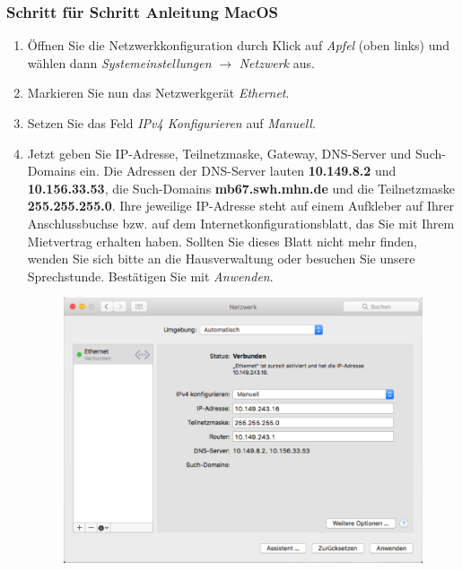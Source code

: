 \documentclass[a4paper,12pt]{scrartcl}
\begin{document}
\subsubsection*{Schritt für Schritt Anleitung MacOS}
\begin{enumerate}
    \item Öffnen Sie die Netzwerkkonfiguration durch Klick auf \emph{Apfel} (oben links) und wählen dann \emph{Systemeinstellungen} $\rightarrow$ \emph{Netzwerk} aus.
    \item Markieren Sie nun das Netzwerkgerät \emph{Ethernet}.
    \item Setzen Sie das Feld \emph{IPv4 Konfigurieren} auf \emph{Manuell}.
    \item Jetzt geben Sie IP-Adresse, Teilnetzmaske, Gateway, DNS-Server und Such-Domains ein. Die Adressen der DNS-Server lauten \textbf{10.149.8.2} und \textbf{10.156.33.53}, die Such-Domains \textbf{mb67.swh.mhn.de} und die Teilnetzmaske \textbf{255.255.255.0}. Ihre jeweilige IP-Adresse steht auf einem Aufkleber auf Ihrer Anschlussbuchse bzw. auf dem Internetkonfigurationsblatt, das Sie mit Ihrem Mietvertrag erhalten haben. Sollten Sie dieses Blatt nicht mehr finden, wenden Sie sich bitte an die Hausverwaltung oder besuchen Sie unsere Sprechstunde. Bestätigen Sie mit \emph{Anwenden}.
      \begin{figure}[h!]
      \centering
        \begin{minipage}[c]{0.60\linewidth}
          \centering
          \includegraphics[width=0.9\linewidth,keepaspectratio]{Bilder/IP_MAC_mb}
        \end{minipage}
      \vspace{-20pt}
      \end{figure}
\end{enumerate}
\vspace{-10pt}
\end{document}
